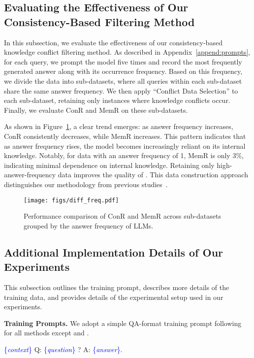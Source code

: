 \subsection{Evaluating the Effectiveness of Our Consistency-Based Filtering Method}
\label{append:data_freq}

In this subsection, we evaluate the effectiveness of our consistency-based knowledge conflict filtering method. As described in Appendix~\ref{append:prompts}, for each query, we prompt the model five times and record the most frequently generated answer along with its occurrence frequency. Based on this frequency, we divide the data into sub-datasets, where all queries within each sub-dataset share the same answer frequency. We then apply ``Conflict Data Selection'' to each sub-dataset, retaining only instances where knowledge conflicts occur. Finally, we evaluate ConR and MemR on these sub-datasets.

As shown in Figure~\ref{fig:diff_freq}, a clear trend emerges: as answer frequency increases, ConR consistently decreases, while MemR increases. This pattern indicates that as answer frequency rises, the model becomes increasingly reliant on its internal knowledge. Notably, for data with an answer frequency of 1, MemR is only 3\%, indicating minimal dependence on internal knowledge. Retaining only high-answer-frequency data improves the quality of \dataset{}. This data construction approach distinguishes our methodology from previous studies~\cite{longpre2021entity,xie2023adaptive}.

\begin{figure}[t!]
  \centering
  \texttt{[image: figs/diff\_freq.pdf]}
  \caption{Performance comparison of ConR and MemR across sub-datasets grouped by the answer frequency of LLMs.}
  \label{fig:diff_freq}
\end{figure}





\subsection{Additional Implementation Details of Our Experiments}
\label{append:implementation}
This subsection outlines the training prompt, describes more details of the training data, and provides details of the experimental setup used in our experiments.

\textbf{Training Prompts.}
We adopt a simple QA-format training prompt following~\citet{zhou2023context} for all methods except \attrprompt{} and \oiprompt{}.
\begin{tcolorbox}
[title=Base Prompt ,colback=blue!10,colframe=blue!50!black,arc=1mm,boxrule=1pt,left=1mm,right=1mm,top=1mm,bottom=1mm]
\textcolor{blue}{\{\textit{context}\}} 
Q: \textcolor{blue}{\{\textit{question}\}} ? 
A: \textcolor{blue}{\{\textit{answer}\}}.
\end{tcolorbox}


